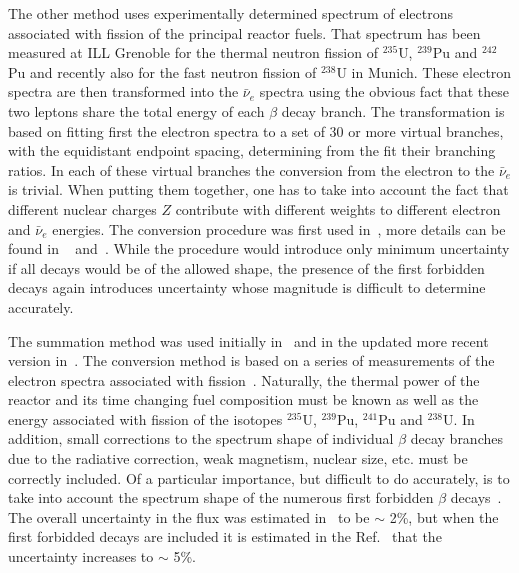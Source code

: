  The other method uses experimentally determined spectrum of electrons associated with fission of the principal reactor fuels. That spectrum has been 
 measured at ILL Grenoble for the thermal neutron fission of $^{235}$U, $^{239}$Pu and $^{242}$Pu and recently also for the fast neutron fission of $^{238}$U
 in Munich. These electron spectra are then transformed into the $\bar{\nu}_e$ spectra using the obvious fact that these two leptons share the total energy
 of each $\beta$ decay branch. The transformation is based on fitting first the electron spectra to a set of 30 or more virtual branches, with the equidistant
 endpoint spacing, determining from the fit their branching ratios. In each of these virtual branches the conversion from the electron to the $\bar{\nu}_e$ is 
 trivial. When putting them together, one has to take into account the fact that different nuclear charges $Z$ contribute with different weights to different electron
 and $\bar{\nu}_e$ energies. The conversion procedure was first used in~\cite{vonFeilitzsch,Schreckenbach,Hahn}, more details can be found in
~\cite{Vogel07} and~\cite{Huber}.
 While the procedure would introduce only minimum uncertainty if all decays would be of the allowed shape, the presence
 of the first forbidden decays again introduces uncertainty whose magnitude is difficult to determine accurately.


The summation method was used
initially in~\cite{Davis,Vogel81,Klapdor-Pu,Klapdor-U,Kopeikin} and in the updated more recent version in~\cite{Mueller, Huber}. The conversion method is based on a series
of measurements of the electron spectra associated with fission~\cite{vonFeilitzsch,Schreckenbach,Hahn,Haag}. Naturally, the thermal power of the reactor
and its time changing fuel composition must be known as well as the energy associated with fission of the isotopes $^{235}$U, $^{239}$Pu, $^{241}$Pu
and $^{238}$U. In addition, small corrections to the spectrum shape of individual $\beta$ decay branches due to the radiative correction, weak magnetism,
nuclear size,
etc. must be correctly included. Of a particular importance, but difficult to do accurately, is to take into account the spectrum shape of the numerous
first forbidden $\beta$ decays~\cite{Hayes}. The overall uncertainty in the flux was estimated in~\cite{Mueller, Huber} to be $\sim$ 2\%, but when the
first forbidded decays are included it is estimated in the Ref.~\cite{Hayes} that the uncertainty increases to $\sim$ 5\%.

